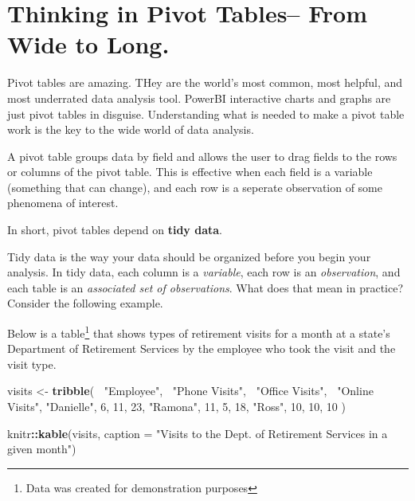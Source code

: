 \documentclass[]{book}
\newenvironment{Shaded}{\begin{snugshade}}{\end{snugshade}}
\newcommand{\KeywordTok}[1]{\textcolor[rgb]{0.13,0.29,0.53}{\textbf{#1}}}
\newcommand{\DataTypeTok}[1]{\textcolor[rgb]{0.13,0.29,0.53}{#1}}
\newcommand{\DecValTok}[1]{\textcolor[rgb]{0.00,0.00,0.81}{#1}}
\newcommand{\StringTok}[1]{\textcolor[rgb]{0.31,0.60,0.02}{#1}}
\newcommand{\OperatorTok}[1]{\textcolor[rgb]{0.81,0.36,0.00}{\textbf{#1}}}
\newcommand{\NormalTok}[1]{#1}
\begin{document}
\section{Thinking in Pivot Tables-- From Wide to
Long.}\label{thinking-in-pivot-tables-from-wide-to-long.}

Pivot tables are amazing. THey are the world's most common, most
helpful, and most underrated data analysis tool. PowerBI interactive
charts and graphs are just pivot tables in disguise. Understanding what
is needed to make a pivot table work is the key to the wide world of
data analysis.

A pivot table groups data by field and allows the user to drag fields to
the rows or columns of the pivot table. This is effective when each
field is a variable (something that can change), and each row is a
seperate observation of some phenomena of interest.

In short, pivot tables depend on \textbf{tidy data}.

Tidy data is the way your data should be organized before you begin your
analysis. In tidy data, each column is a \emph{variable}, each row is an
\emph{observation}, and each table is an \emph{associated set of
observations}. What does that mean in practice? Consider the following
example.

Below is a table\footnote{Data was created for demonstration purposes}
that shows types of retirement visits for a month at a state's
Department of Retirement Services by the employee who took the visit and
the visit type.

\begin{Shaded}
\begin{Highlighting}[]
\NormalTok{visits <-}\StringTok{ }\KeywordTok{tribble}\NormalTok{(}
  \OperatorTok{~}\StringTok{"Employee"}\NormalTok{, }\OperatorTok{~}\StringTok{"Phone Visits"}\NormalTok{, }\OperatorTok{~}\StringTok{"Office Visits"}\NormalTok{, }\OperatorTok{~}\StringTok{"Online Visits"}\NormalTok{,}
  \StringTok{"Danielle"}\NormalTok{, }\DecValTok{6}\NormalTok{, }\DecValTok{11}\NormalTok{, }\DecValTok{23}\NormalTok{,}
  \StringTok{"Ramona"}\NormalTok{, }\DecValTok{11}\NormalTok{, }\DecValTok{5}\NormalTok{, }\DecValTok{18}\NormalTok{,}
  \StringTok{"Ross"}\NormalTok{, }\DecValTok{10}\NormalTok{, }\DecValTok{10}\NormalTok{, }\DecValTok{10} 
\NormalTok{)}

\NormalTok{knitr}\OperatorTok{::}\KeywordTok{kable}\NormalTok{(visits, }\DataTypeTok{caption =} \StringTok{"Visits to the Dept. of Retirement Services in a given month"}\NormalTok{)}
\end{Highlighting}
\end{Shaded}
\end{document}

